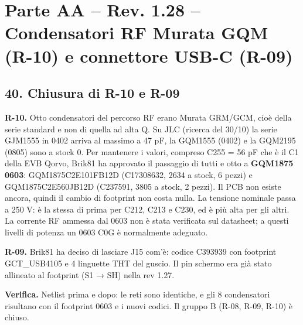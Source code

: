 \clearpage
\section[Parte AA – Rev. 1.28 – Condensatori RF Murata GQM (R-10) e connettore USB-C (R-09)]{Parte AA – Rev. 1.28 – Condensatori RF Murata GQM (R-10) e connettore USB-C (R-09)}

\subsection[40. Chiusura di R-10 e R-09]{40. Chiusura di R-10 e R-09}

\textbf{R-10.} Otto condensatori del percorso RF erano Murata GRM/\allowbreak{}GCM, cioè della serie standard e non di quella ad alta Q. Su JLC (ricerca del 30/\allowbreak{}10) la serie GJM1555 in 0402 arriva al massimo a 47 pF, la GQM1555 (0402) e la GQM2195 (0805) sono a stock 0. Per mantenere i valori, compreso C255 = 56 pF che è il C1 della EVB Qorvo, Brik81 ha approvato il passaggio di tutti e otto a \textbf{GQM1875 0603}: GQM1875C2E101FB12D (C17308632, 2634 a stock, 6 pezzi) e GQM1875C2E560JB12D (C237591, 3805 a stock, 2 pezzi). Il PCB non esiste ancora, quindi il cambio di footprint non costa nulla. La tensione nominale passa a 250 V: è la stessa di prima per C212, C213 e C230, ed è più alta per gli altri. La corrente RF ammessa dal 0603 non è stata verificata sul datasheet; a questi livelli di potenza un 0603 C0G è normalmente adeguato.

\textbf{R-09.} Brik81 ha deciso di lasciare J15 com'è: codice C393939 con footprint GCT\_\allowbreak{}USB4105 e 4 linguette THT del guscio. Il pin schermo era già stato allineato al footprint (S1 → SH) nella rev 1.27.

\textbf{Verifica.} Netlist prima e dopo: le reti sono identiche, e gli 8 condensatori risultano con il footprint 0603 e i nuovi codici. Il gruppo B (R-08, R-09, R-10) è chiuso.

